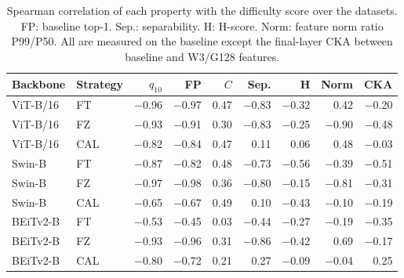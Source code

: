 \begin{table}[h]
\centering
\caption{Spearman correlation of each property with the difficulty score over the {} datasets. FP: baseline top-1. Sep.: separability. H: H-score. Norm: feature norm ratio P99/P50. All are measured on the baseline except the final-layer CKA between baseline and W3/G128 features.}
\label{tab:properties}
\setlength{\tabcolsep}{1.5pt}
\footnotesize
\begin{tabular}{llrrrrrrr}
\toprule
Backbone & Strategy & $q_{10}$ & FP & $C$ & Sep. & H & Norm & CKA \\
\midrule
ViT-B/16 & FT & $-$0.96 & $-$0.97 & 0.47 & $-$0.83 & $-$0.32 & 0.42 & $-$0.20 \\
ViT-B/16 & FZ & $-$0.93 & $-$0.91 & 0.30 & $-$0.83 & $-$0.25 & $-$0.90 & $-$0.48 \\
ViT-B/16 & CAL & $-$0.82 & $-$0.84 & 0.47 & 0.11 & 0.06 & 0.48 & $-$0.03 \\
Swin-B & FT & $-$0.87 & $-$0.82 & 0.48 & $-$0.73 & $-$0.56 & $-$0.39 & $-$0.51 \\
Swin-B & FZ & $-$0.97 & $-$0.98 & 0.36 & $-$0.80 & $-$0.15 & $-$0.81 & $-$0.31 \\
Swin-B & CAL & $-$0.65 & $-$0.67 & 0.49 & 0.10 & $-$0.43 & $-$0.10 & $-$0.19 \\
BEiTv2-B & FT & $-$0.53 & $-$0.45 & 0.03 & $-$0.44 & $-$0.27 & $-$0.19 & $-$0.35 \\
BEiTv2-B & FZ & $-$0.93 & $-$0.96 & 0.31 & $-$0.86 & $-$0.42 & 0.69 & $-$0.17 \\
BEiTv2-B & CAL & $-$0.80 & $-$0.72 & 0.21 & 0.27 & $-$0.09 & $-$0.04 & 0.25 \\
\bottomrule
\end{tabular}
\end{table}
